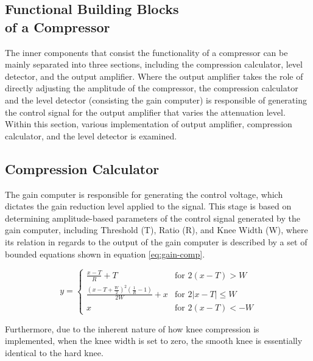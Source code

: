\documentclass[10pt]{article}
\begin{document}
\begin{multicols*}{2}
        \section[Functional Building Blocks of a Compressor]{Functional Building Blocks\\of a Compressor}
            The inner components that consist the functionality of a compressor can be mainly separated into three sections, including the compression calculator, level detector, and the output amplifier. Where the output amplifier takes the role of directly adjusting the amplitude of the compressor, the compression calculator and the level detector (consisting the gain computer) is responsible of generating the control signal for the output amplifier that varies the attenuation level. Within this section, various implementation of output amplifier, compression calculator, and the level detector is examined.

            \subsection{Compression Calculator}
                The gain computer is responsible for generating the control voltage, which dictates the gain reduction level applied to the signal. This stage is based on determining amplitude-based parameters of the control signal generated by the gain computer, including Threshold (T), Ratio (R), and Knee Width (W), where its relation in regards to the output of the gain computer is described by a set of bounded equations shown in equation \ref{eq:gain-comp}.

                    \begin{equation}
                        y=
                        \begin{cases}
                            \frac{x-T}{R}+T & \text{for $2(x-T)>W$}\\[5pt]
                            \frac{(x-T+\frac{W}{2})^2(\frac{1}{R}-1)}{2W}+x & \text{for $2\left\lvert x-T\right\rvert\leq W$}\\[5pt]
                            x & \text{for $2(x-T)<-W$}
                        \end{cases}
                        \label{eq:gain-comp}
                    \end{equation}

                \noindent Furthermore, due to the inherent nature of how knee compression is implemented, when the knee width is set to zero, the smooth knee is essentially identical to the hard knee.
            

\end{multicols*}
\end{document}
